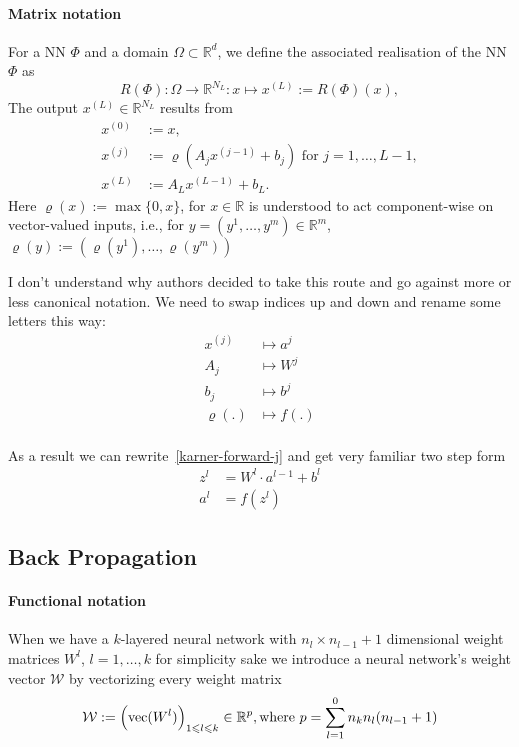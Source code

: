 \documentclass{article}
\def\RealSet{\mathbb{R}}
\DeclareMathOperator{\vect}{vec}
\begin{document}
\paragraph{Matrix notation}
For a NN $\Phi$ and a domain $\Omega\subset\RealSet^d$, we define the associated realisation of the NN $\Phi$ as
\[
R(\Phi) \colon \Omega \rightarrow \RealSet^{N_L} \colon x \mapsto x^{(L)}:=R(\Phi)(x),
\]
The output $x^{(L)}\in \RealSet^{N_L}$ results from
\begin{align}
x^{(0)} &:= x,\\
x^{(j)} &:= \varrho(A_j x^{(j-1)} + b_j) \text{ for $j=1,\dots,L-1$}, \label{karner-forward-j}\\
x^{(L)} &:= A_L x^{(L-1)} + b_L.
\end{align}
Here $\varrho(x) := \max \{0,x\}$, for $x\in\RealSet$ is understood to act component-wise on vector-valued inputs, i.e., for $y=(y^1,\dots,y^m)\in\RealSet^m$, $\varrho(y) := (\varrho(y^1),\dots,\varrho(y^m))$

I don't understand why authors decided to take this route and go against more or less canonical notation. We need to swap indices up and down and rename some letters this way:
\begin{align}
x^{(j)} &\mapsto a^j \\
A_j &\mapsto W^j \\
b_j &\mapsto b^j \\
\varrho(.) &\mapsto f(.) \\
\end{align}

As a result we can rewrite~\eqref{karner-forward-j} and get very familiar two step form
\begin{align}
z^l &= W^l \cdot a^{l-1} + b^l \\
a^l &= f(z^l)
\end{align}


\subsection{Back Propagation}

\paragraph{Functional notation}
When we have a $k$-layered neural network with $n_l \times n_{l-1}+1$ dimensional weight matrices $W^l$, $l=1,\dots,k$ for simplicity sake we introduce a neural network's weight vector $\mathcal{W}$ by vectorizing every weight matrix
\[
\mathcal{W} := \Bigl(\vect(W^l)\Bigr)_{1\leqslant l\leqslant k} \in \RealSet^p, \text{where $p=\sum_{l=1}^0{n_k}n_l(n_{l-1}+1)$}
\]
\end{document}
